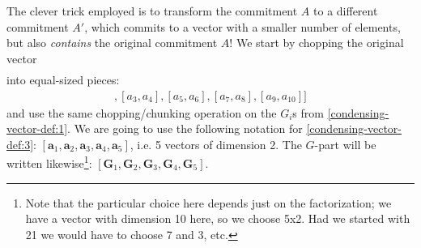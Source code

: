 \documentclass[10pt,a4paper]{article}
\begin{document}
The clever trick employed is to transform the commitment $A$ to a
different commitment $A'$, which commits to a vector with a smaller number
of elements, but also \emph{contains} the original commitment $A$! We start
by chopping the original vector
\begin{align}
[a_1, a_2, a_3, a_4, a_5, a_6, a_7, a_8, a_9, a_{10}] \label{condensing-vector-def:2}
\end{align}
into equal-sized pieces:
\begin{align}
[[a_1, a_2], [a_3, a_4], [a_5, a_6], [a_7, a_8], [a_9, a_{10}]] \label{condensing-vector-def:3}
\end{align}
and use the same chopping/chunking operation on the $G_i$s from \eqref{condensing-vector-def:1}. 
We are going to use the following notation for \eqref{condensing-vector-def:3}: 
$[\textbf{a}_1, \textbf{a}_2, \textbf{a}_3, \textbf{a}_4, \textbf{a}_5]$, i.e. 5 vectors
of dimension 2. The $G$-part will be written likewise\footnote{Note that 
the particular choice here depends just on the factorization; we have a vector with dimension 10 here, 
so we choose 5x2. Had we started with 21 we would have to choose 7 and 3, etc.}:
$[\textbf{G}_1, \textbf{G}_2, \textbf{G}_3, \textbf{G}_4, \textbf{G}_5]$.
\end{document}

